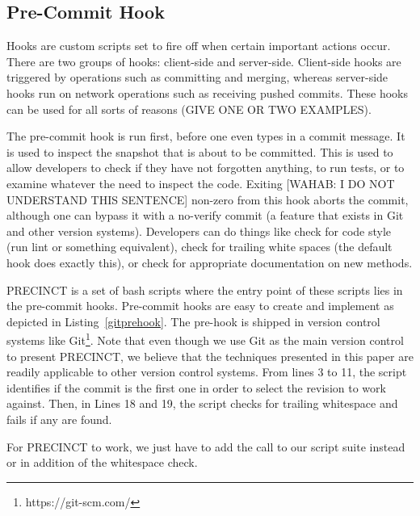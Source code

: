 \documentclass[conference]{IEEEtran}
\begin{document}
\subsection{Pre-Commit Hook}
\label{sub:Pre-Commit Hook}

Hooks are custom scripts set to fire off when certain important actions occur.
There are two groups of  hooks: client-side and server-side. Client-side hooks are triggered by operations such as committing and merging, whereas server-side hooks run on network operations such as receiving pushed commits. These hooks can be used for all sorts of reasons (GIVE ONE OR TWO EXAMPLES).


The pre-commit hook is run first, before one even types in a commit message. It is used to inspect the snapshot that is about to be committed. This is used to allow developers to check if they have not forgotten anything, to run tests, or to examine whatever the need to inspect the code. Exiting [WAHAB: I DO NOT UNDERSTAND THIS SENTENCE] non-zero from this hook aborts the commit, although one can bypass it with a no-verify commit (a feature that exists in Git and other version systems).
Developers can do things like check for code style (run lint or something equivalent), check for trailing white spaces (the default hook does exactly this), or check for appropriate documentation on new methods.

PRECINCT is a set of bash scripts where the entry point of these scripts lies in the pre-commit hooks. Pre-commit hooks are easy to create and implement as depicted in Listing~\ref{gitprehook}. The pre-hook is shipped in version control systems like Git\footnote{https://git-scm.com/}. Note that even though we use Git as the main version control to present PRECINCT, we believe that the techniques presented in this paper are readily applicable to other version control systems. From lines 3 to 11, the script identifies if the commit is the first one in order to select the revision to work against. Then, in Lines 18 and 19, the script checks for trailing whitespace and fails if any are found.

\noindent\begin{minipage}{0.90\linewidth}

  

\end{minipage}

For PRECINCT to work, we just have to add the call to our script suite instead or in addition of the whitespace check.
\end{document}
